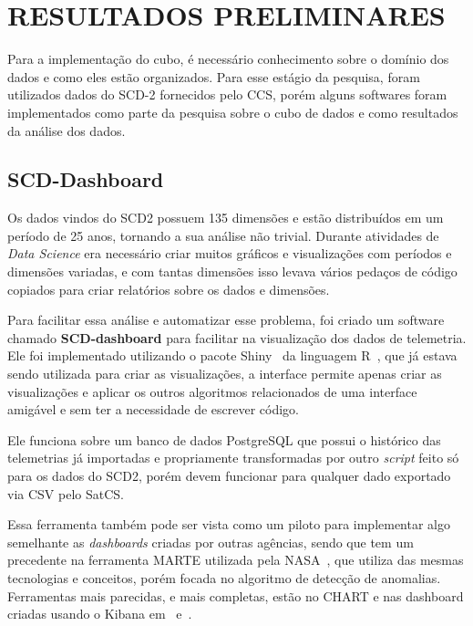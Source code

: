 
\chapter{RESULTADOS PRELIMINARES}\label{ch:impl}

Para a implementação do cubo, é necessário conhecimento sobre o domínio dos dados e como eles estão organizados.
Para esse estágio da pesquisa, foram utilizados dados do SCD-2 fornecidos pelo CCS, porém alguns softwares foram implementados como parte da pesquisa sobre o cubo de dados e como resultados da análise dos dados.

\section{SCD-Dashboard}\label{ch:impl:dash}

Os dados vindos do SCD2 possuem 135 dimensões e estão distribuídos em um período de 25 anos, tornando a sua análise não trivial.
Durante atividades de \textit{Data Science} era necessário criar muitos gráficos e visualizações com períodos e dimensões variadas, e com tantas dimensões isso levava vários pedaços de código copiados para criar relatórios sobre os dados e dimensões.

Para facilitar essa análise e automatizar esse problema, foi criado um software chamado \textbf{SCD-dashboard} para facilitar na visualização dos dados de telemetria.
Ele foi implementado utilizando o pacote Shiny~\cite{changShinyWebApplication2019} da linguagem R~\cite{rcoreteamLanguageEnvironmentStatistical2018}, que já estava sendo utilizada para criar as visualizações, a interface permite apenas criar as visualizações e aplicar os outros algoritmos relacionados de uma interface amigável e sem ter a necessidade de escrever código.

Ele funciona sobre um banco de dados PostgreSQL que possui o histórico das telemetrias já importadas e propriamente transformadas por outro \textit{script} feito só para os dados do SCD2, porém devem funcionar para qualquer dado exportado via CSV pelo SatCS.

Essa ferramenta também pode ser vista como um piloto para implementar algo semelhante as \textit{dashboards} criadas por outras agências, sendo que tem um precedente na ferramenta MARTE utilizada pela NASA~\cite{fernandezTelemetryAnomalyDetection2017}, que utiliza das mesmas tecnologias e conceitos, porém focada no algoritmo de detecção de anomalias.
Ferramentas mais parecidas, e mais completas, estão no CHART e nas dashboard criadas usando o Kibana em~\cite{mateikUsingBigData2017} e~\cite{zhangBigDataFramework2017}.

